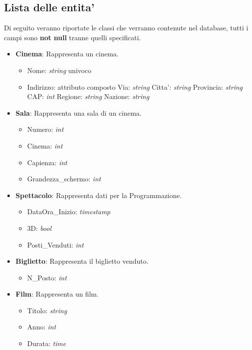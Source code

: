 \documentclass[10pt]{article}
\begin{document}
	\subsection{Lista delle entita'}
	Di seguito veranno riportate le classi che verranno contenute nel database, tutti i campi sono \textbf{not null} tranne quelli specificati.\\
	\begin{itemize}
		\item \textbf{Cinema}: Rappresenta un cinema.
		\begin{itemize}
			\item Nome: \textit{string} univoco
			\item Indirizzo: attributo composto
				\subitem Via: \textit{string}
				\subitem Citta': \textit{string}
				\subitem Provincia: \textit{string}
				\subitem CAP: \textit{int}
				\subitem Regione: \textit{string}
				\subitem Nazione: \textit{string}			
		\end{itemize}
		\item \textbf{Sala}: Rappresenta una sala di un cinema.
		\begin{itemize}
		    \item Numero: \textit{int}
		    \item Cinema: \textit{int}
			\item Capienza: \textit{int}
			\item Grandezza\_schermo: \textit{int}
		\end{itemize}
		\item \textbf{Spettacolo}: Rappresenta dati per la Programmazione.
		\begin{itemize}
			\item DataOra\_Inizio: \textit{timestamp}
			\item 3D: \textit{bool}
			\item Posti\_Venduti: \textit{int}
		\end{itemize}
		\item \textbf{Biglietto}: Rappresenta il biglietto venduto.
		\begin{itemize}
			\item N\_Posto: \textit{int}
		\end{itemize}
		\item \textbf{Film}: Rappresenta un film.
		\begin{itemize}
			\item Titolo: \textit{string}
			\item Anno: \textit{int}
			\item Durata: \textit{time}

\end{itemize}
\end{itemize}
\end{document}
